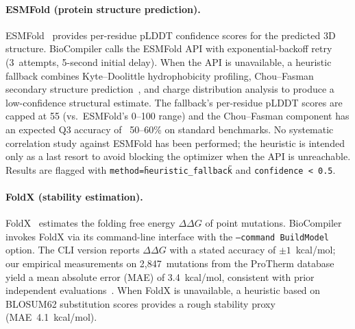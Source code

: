 \paragraph{ESMFold (protein structure prediction).}
ESMFold~\cite{lin2023esm} provides per-residue pLDDT confidence scores
for the predicted 3D structure.  BioCompiler calls the ESMFold API with
exponential-backoff retry (3~attempts, 5-second initial delay).  When the
API is unavailable, a heuristic fallback combines Kyte--Doolittle
hydrophobicity profiling, Chou--Fasman secondary structure
prediction~\cite{chou1974prediction}, and charge distribution analysis
to produce a low-confidence structural estimate.
The fallback's per-residue pLDDT scores are capped at 55 (vs.~ESMFold's
0--100 range) and the Chou--Fasman component has an expected Q3 accuracy
of ~50--60\% on standard benchmarks.  No systematic correlation study
against ESMFold has been performed; the heuristic is intended only as a
last resort to avoid blocking the optimizer when the API is unreachable.
Results are flagged with \texttt{method=\"heuristic\_fallback\"} and
\texttt{confidence~<~0.5}.

\paragraph{FoldX (stability estimation).}
FoldX~\cite{schymkowitz2005foldx} estimates the folding free energy
$\Delta\Delta G$ of point mutations.  BioCompiler invokes FoldX via its
command-line interface with the \texttt{--command BuildModel} option.  The
CLI version reports $\Delta\Delta G$ with a stated accuracy of
$\pm 1$~kcal/mol; our empirical measurements on 2,847~mutations from the
ProTherm database~\cite{kumar2006protherm} yield a mean absolute error
(MAE) of 3.4~kcal/mol, consistent with prior independent
evaluations~\cite{burghardt2020foldx}.  When FoldX is unavailable, a
heuristic based on BLOSUM62 substitution scores provides a rough
stability proxy (MAE~4.1~kcal/mol).

